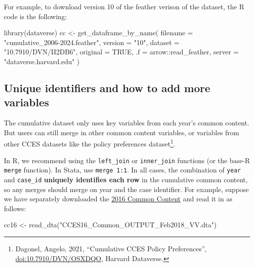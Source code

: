 \documentclass[10pt,article,oneside]{memoir}
\newenvironment{Shaded}{\begin{snugshade}}{\end{snugshade}}
\newcommand{\AttributeTok}[1]{\textcolor[rgb]{0.40,0.45,0.13}{#1}}
\newcommand{\ConstantTok}[1]{\textcolor[rgb]{0.56,0.35,0.01}{#1}}
\newcommand{\FunctionTok}[1]{\textcolor[rgb]{0.28,0.35,0.67}{#1}}
\newcommand{\NormalTok}[1]{\textcolor[rgb]{0.00,0.23,0.31}{#1}}
\newcommand{\OtherTok}[1]{\textcolor[rgb]{0.00,0.23,0.31}{#1}}
\newcommand{\SpecialCharTok}[1]{\textcolor[rgb]{0.37,0.37,0.37}{#1}}
\newcommand{\StringTok}[1]{\textcolor[rgb]{0.13,0.47,0.30}{#1}}
\begin{document}
For example, to download version 10 of the feather verison of the
dataset, the R code is the following:

\begin{Shaded}
\begin{Highlighting}[]
\FunctionTok{library}\NormalTok{(dataverse)}
\NormalTok{cc }\OtherTok{\textless{}{-}} \FunctionTok{get\_dataframe\_by\_name}\NormalTok{(}
  \AttributeTok{filename =} \StringTok{"cumulative\_2006{-}2024.feather"}\NormalTok{,}
  \AttributeTok{version =} \StringTok{"10"}\NormalTok{,}
  \AttributeTok{dataset =} \StringTok{"10.7910/DVN/II2DB6"}\NormalTok{,}
  \AttributeTok{original =} \ConstantTok{TRUE}\NormalTok{,}
  \AttributeTok{.f =}\NormalTok{ arrow}\SpecialCharTok{::}\NormalTok{read\_feather,}
  \AttributeTok{server =} \StringTok{"dataverse.harvard.edu"}
\NormalTok{)}
\end{Highlighting}
\end{Shaded}

\subsection{Unique identifiers and how to add more
variables}\label{unique-identifiers-and-how-to-add-more-variables}

The cumulative dataset only uses key variables from each year's common
content. But users can still merge in other common content variables, or
variables from other CCES datasets like the policy preferences
dataset\footnote{Dagonel, Angelo, 2021, ``Cumulative CCES Policy Preferences'', \href{https://dataverse.harvard.edu/dataset.xhtml?persistentId=doi:10.7910/DVN/OSXDQO}{\url{doi:10.7910/DVN/OSXDQO}}, Harvard Dataverse.}.

In R, we recommend using the \texttt{left\_join} or \texttt{inner\_join}
functions (or the base-R \texttt{merge} function). In Stata, use
\texttt{merge\ 1:1}. In all cases, the combination of \texttt{year} and
\texttt{case\_id} \textbf{uniquely identifies each row} in the
cumulative common content, so any merges should merge on year and the
case identifier. For example, suppose we have separately downloaded the
\href{https://doi.org/10.7910/DVN/GDF6Z0/JPMOZZ}{2016 Common Content}
and read it in as follows:

\begin{Shaded}
\begin{Highlighting}[]
\NormalTok{cc16 }\OtherTok{\textless{}{-}} \FunctionTok{read\_dta}\NormalTok{(}\StringTok{"CCES16\_Common\_OUTPUT\_Feb2018\_VV.dta"}\NormalTok{)}
\end{Highlighting}
\end{Shaded}
\end{document}
